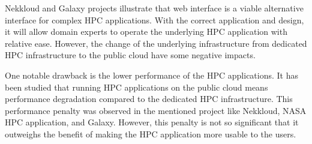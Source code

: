 %
%
%

Nekkloud and Galaxy projects illustrate that web interface is a viable alternative interface for complex HPC applications. With the correct application and design, it will allow domain experts to operate the underlying HPC application with relative ease. However,  the change of the underlying infrastructure from dedicated HPC infrastructure to the public cloud have some negative impacts.

One notable drawback is the lower performance of the HPC applications. It has been studied that running HPC applications on the public cloud means performance degradation compared to the dedicated HPC infrastructure. This performance penalty was observed in the mentioned project like Nekkloud, NASA HPC application, and Galaxy. However, this penalty is not so significant that it outweighs the benefit of making the HPC application more usable to the users.

